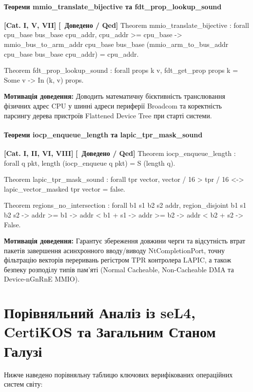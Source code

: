 \documentclass{article}
\let\originalfootnotesize\footnotesize
\let\oldverbatim\verbatim
\let\oldendverbatim\endverbatim
\renewenvironment{verbatim}{\originalfootnotesize\oldverbatim}{\oldendverbatim}
\newcommand{\thmcategory}[1]{{\small\textbf{\color{coreblue}[#1]}}}
\newcommand{\thmproven}{{\small\textbf{\color{productgreen}[\checkmark\ Доведено / Qed]}}}
\newcommand{\thmmotivation}[1]{%
  \par\smallskip\noindent\colorbox{boxbg}{\parbox{\dimexpr\linewidth-2\fboxsep\relax}{%
    \small\textbf{Мотивація доведення:} #1%
  }}\par\medskip
}
\begin{document}
\paragraph{Теореми mmio\_translate\_bijective та fdt\_prop\_lookup\_sound} \thmcategory{Cat. I, V, VII} \thmproven
\begin{verbatim}
Theorem mmio_translate_bijective : forall cpu_base bus_base cpu_addr,
  cpu_addr >= cpu_base ->
  mmio_bus_to_arm_addr cpu_base bus_base (mmio_arm_to_bus_addr cpu_base bus_base cpu_addr) = cpu_addr.

Theorem fdt_prop_lookup_sound : forall props k v,
  fdt_get_prop props k = Some v -> In (k, v) props.
\end{verbatim}
\thmmotivation{Доводить математичну бієктивність транслювання фізичних адрес CPU у шинні адреси периферії Broadcom та коректність парсингу дерева пристроїв Flattened Device Tree при старті системи.}

\paragraph{Теореми iocp\_enqueue\_length та lapic\_tpr\_mask\_sound} \thmcategory{Cat. I, II, VI, VIII} \thmproven
\begin{verbatim}
Theorem iocp_enqueue_length : forall q pkt,
  length (iocp_enqueue q pkt) = S (length q).

Theorem lapic_tpr_mask_sound : forall tpr vector,
  vector / 16 > tpr / 16 <-> lapic_vector_masked tpr vector = false.

Theorem regions_no_intersection : forall b1 s1 b2 s2 addr,
  region_disjoint b1 s1 b2 s2 ->
  addr >= b1 -> addr < b1 + s1 -> addr >= b2 -> addr < b2 + s2 -> False.
\end{verbatim}
\thmmotivation{Гарантує збереження довжини черги та відсутність втрат пакетів завершення асинхронного вводу/виводу NtCompletionPort, точну фільтрацію векторів переривань регістром TPR контролера LAPIC, а також безпеку розподілу типів пам'яті (Normal Cacheable, Non-Cacheable DMA та Device-nGnRnE MMIO).}

\section{Порівняльний Аналіз із seL4, CertiKOS та Загальним Станом Галузі}

Нижче наведено порівняльну таблицю ключових верифікованих операційних систем світу:
\end{document}
